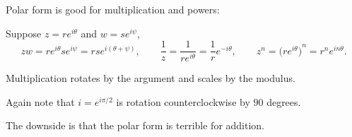 \documentclass[10pt,aspectratio=169]{beamer}
\begin{document}
\begin{frame}

Polar form is good for multiplication and powers:

\pause
\medskip

Suppose $z = r e^{i\theta}$ and $w = s e^{i \psi}$,
\pause
\begin{equation*}
zw =
r e^{i \theta} s e^{i \psi} = 
rs e^{i (\theta+ \psi)},
\qquad
\frac{1}{z} =
\frac{1}{r e^{i \theta}} =
\frac{1}{r} e^{-i \theta} ,
\qquad
z^n =
{\bigl(r e^{i \theta}\bigr)}^n =
r^n e^{i n\theta} .
\end{equation*}

\medskip
\pause

Multiplication rotates by the argument and scales by the modulus.

\pause
\medskip

Again note that $i = e^{i \pi / 2}$ is
rotation counterclockwise by $90$ degrees.

\pause
\medskip

The downside is that the polar form is terrible for addition.

\end{frame}
\end{document}
